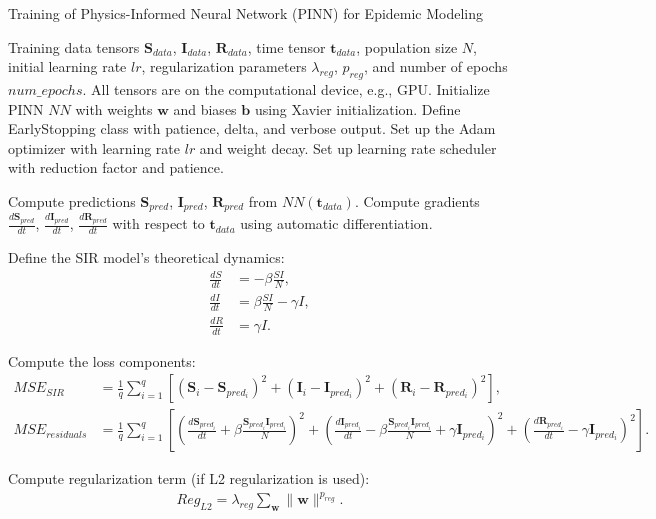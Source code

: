 \documentclass[12pt, letterpaper]{report}
\begin{document}
\begin{algorithm}
\caption{Training of Physics-Informed Neural Network (PINN) for Epidemic Modeling}
\begin{algorithmic}[1]
\Require Training data tensors $\bm{S}_{data}$, $\bm{I}_{data}$, $\bm{R}_{data}$, time tensor $\bm{t}_{data}$, population size $N$, initial learning rate $lr$, regularization parameters $\lambda_{reg}$, $p_{reg}$, and number of epochs $num\_epochs$.
\Ensure All tensors are on the computational device, e.g., GPU.
\State Initialize PINN $NN$ with weights $\bm{w}$ and biases $\bm{b}$ using Xavier initialization.
\State Define EarlyStopping class with patience, delta, and verbose output.
\State Set up the Adam optimizer with learning rate $lr$ and weight decay.
\State Set up learning rate scheduler with reduction factor and patience.

    \State Compute predictions $\bm{S}_{pred}$, $\bm{I}_{pred}$, $\bm{R}_{pred}$ from $NN(\bm{t}_{data})$.
    \State Compute gradients $\frac{d\bm{S}_{pred}}{dt}$, $\frac{d\bm{I}_{pred}}{dt}$, $\frac{d\bm{R}_{pred}}{dt}$ with respect to $\bm{t}_{data}$ using automatic differentiation.
    
    \State Define the SIR model's theoretical dynamics:
    \begin{align*}
    \frac{dS}{dt} & = -\beta \frac{S I}{N}, \\
    \frac{dI}{dt} & = \beta \frac{S I}{N} - \gamma I, \\
    \frac{dR}{dt} & = \gamma I.
    \end{align*}
    
    \State Compute the loss components:
    \begin{align*}
    MSE_{SIR} & = \frac{1}{q} \sum_{i=1}^{q} \left[ \left(\bm{S}_{i} - \bm{S}_{pred_i}\right)^2 + \left(\bm{I}_{i} - \bm{I}_{pred_i}\right)^2 + \left(\bm{R}_{i} - \bm{R}_{pred_i}\right)^2 \right], \\
    MSE_{residuals} & = \frac{1}{q} \sum_{i=1}^{q} \left[ \left(\frac{d\bm{S}_{pred_i}}{dt} + \beta \frac{\bm{S}_{pred_i} \bm{I}_{pred_i}}{N}\right)^2 + \left(\frac{d\bm{I}_{pred_i}}{dt} - \beta \frac{\bm{S}_{pred_i} \bm{I}_{pred_i}}{N} + \gamma \bm{I}_{pred_i}\right)^2 + \left(\frac{d\bm{R}_{pred_i}}{dt} - \gamma \bm{I}_{pred_i}\right)^2 \right].
    \end{align*}
    
    \State Compute regularization term (if L2 regularization is used):
    \begin{align*}
    Reg_{L2} = \lambda_{reg} \sum_{\bm{w}} \|\bm{w}\|^{p_{reg}}.
    \end{align*}
    

\end{algorithmic}
\end{algorithm}
\end{document}
